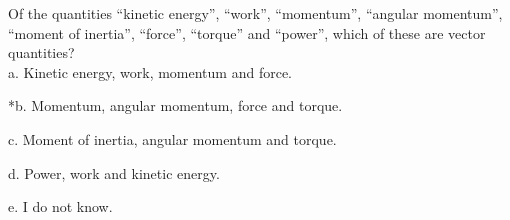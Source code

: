 
Of the quantities ``kinetic energy'', ``work'', ``momentum'',
``angular momentum'', ``moment of inertia'', ``force'', ``torque'' and ``power'', which of these are vector quantities? \\

a. Kinetic energy, work, momentum and force.

*b. Momentum, angular momentum, force and torque.

c. Moment of inertia, angular momentum and torque.

d. Power, work and kinetic energy.

e. I do not know. \\
